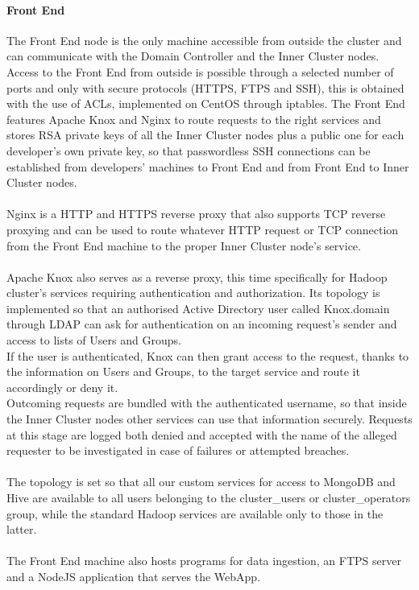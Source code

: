 \paragraph{Front End}
The Front End node is the only machine accessible from outside the cluster and can communicate with the Domain Controller and the Inner Cluster nodes. \\
Access to the Front End from outside is possible through a selected number of ports and only with secure protocols (HTTPS, FTPS and SSH), this is obtained with the use of ACLs, implemented on CentOS through iptables. The Front End features Apache Knox and Nginx to route requests to the right services and stores RSA private keys of all the Inner Cluster nodes plus a public one for each developer's own private key, so that passwordless SSH connections can be established from developers' machines to Front End and from Front End to Inner Cluster nodes. \\
\\
Nginx is a HTTP and HTTPS reverse proxy that also supports TCP reverse proxying and can be used to route whatever HTTP request or TCP connection from the Front End machine to the proper Inner Cluster node's service. \\
\\
Apache Knox also serves as a reverse proxy, this time specifically for Hadoop cluster's services requiring authentication and authorization. Its topology is implemented so that an authorised Active Directory user called Knox.domain through LDAP can ask for authentication on an incoming request's sender and access to lists of Users and Groups.\\ If the user is authenticated, Knox can then grant access to the request, thanks to the information on Users and Groups, to the target service and route it accordingly or deny it. \\ Outcoming requests are bundled with the authenticated username, so that inside the Inner Cluster nodes other services can use that information securely. Requests at this stage are logged both denied and accepted with the name of the alleged requester to be investigated in case of failures or attempted breaches.\\ \\
The topology is set so that all our custom services for access to MongoDB and Hive are available to all users belonging to the cluster\_users or cluster\_operators group, while the standard Hadoop services are available only to those in the latter.
\\
\\
The Front End machine also hosts programs for data ingestion, an FTPS server and a NodeJS application that serves the WebApp.

